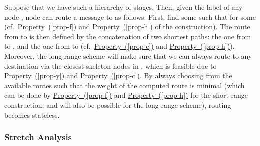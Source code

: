 \documentclass[letterpaper,11pt]{article}
\newcommand{\pprtyref}[1]{\hyperref[#1]{Property~(\ref*{#1})}}
\begin{document}
\newlength{\fparwidth}\addtolength{\fparwidth}{\textwidth}\addtolength{\fparwidth}{-13pt}
\noindent{}
\medskip

Suppose that we have such a hierarchy of  stages. Then, given the label of
any node , node  can
route a message to  as follows: First, find some  such that  for some 
(cf.\ \pprtyref{prop-f} and \pprtyref{prop-h} of the construction). The route
from  to  is then defined by the concatenation of two shortest paths:
the one from  to , and the one from  to  (cf.\ \pprtyref{prop-c} and
\pprtyref{prop-h}). Moreover, the long-range scheme will make sure that we can
always route to any destination via the closest skeleton nodes in , which
is feasible due to \pprtyref{prop-y} and \pprtyref{prop-c}. By always choosing
from the available routes such that the weight of the computed route is minimal
(which can be done by \pprtyref{prop-f} and \pprtyref{prop-h} for the
short-range construction, and will also be possible for the long-range scheme),
routing becomes stateless.

\subsubsection*{Stretch Analysis}
\end{document}
